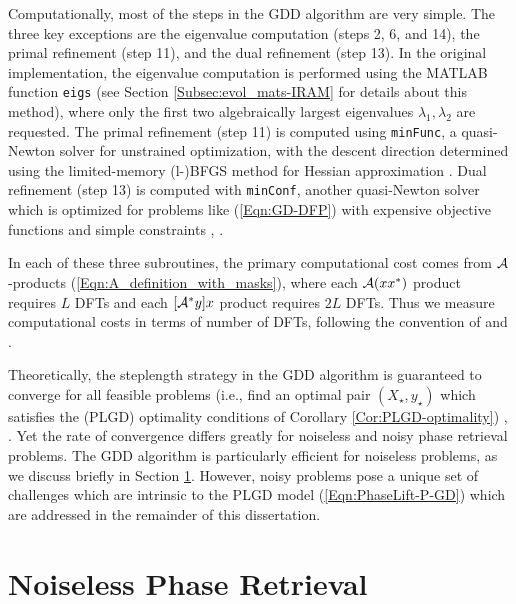 Computationally, most of the steps in the GDD algorithm are very simple.  
The three key exceptions are the eigenvalue computation (steps 2, 6, and 14), the primal refinement (step 11), and the dual refinement (step 13).  
In the original implementation, the eigenvalue computation is performed using the MATLAB function \texttt{eigs} (see Section \ref{Subsec:evol_mats-IRAM} for details about this method), where only the first two algebraically largest eigenvalues $\lambda_1, \lambda_2$ are requested.  
The primal refinement (step 11) is computed using \texttt{minFunc}, a quasi-Newton solver for unstrained optimization, with the descent direction determined using the limited-memory (l-)BFGS method for Hessian approximation \cite{schmidt2005minFunc}.  
Dual refinement (step 13) is computed with \texttt{minConf}, another quasi-Newton solver which is optimized for problems like (\ref{Eqn:GD-DFP}) with expensive objective functions and simple constraints \cite{schmidt2008minConf}, \cite{schmidt2009optimizing}.

In each of these three subroutines, the primary computational cost comes from ${\mathcal A}$-products (\ref{Eqn:A_definition_with_masks}), where each ${\mathcal A}(xx^*)$ product requires $L$ DFTs and each $[{\mathcal A}^*y]x$ product requires $2L$ DFTs.  Thus we measure computational costs in terms of number of DFTs, following the convention of \cite{DBLP:journals/tit/CandesLS15} and \cite{DBLP:journals/siamsc/FriedlanderM16}.





Theoretically, the steplength strategy in the GDD algorithm is guaranteed to converge for all feasible problems (i.e., find an optimal pair $(X_\star, y_\star)$ which satisfies the (PLGD) optimality conditions of Corollary \ref{Cor:PLGD-optimality}) \cite{zhang2004nonmonotone}, \cite[Proposition 1.2.3 and Section 3.3.1]{bertsekas2016nonlinear}.  
Yet the rate of convergence differs greatly for noiseless and noisy phase retrieval problems.  
The GDD algorithm is particularly efficient for noiseless problems, as we discuss briefly in Section \ref{Subsec:PLGD_algo-noiseless_success}.  
However, noisy problems pose a unique set of challenges which are intrinsic to the PLGD model (\ref{Eqn:PhaseLift-P-GD}) which are addressed in the remainder of this dissertation.










\section{Noiseless Phase Retrieval} 		\label{Subsec:PLGD_algo-noiseless_success}





